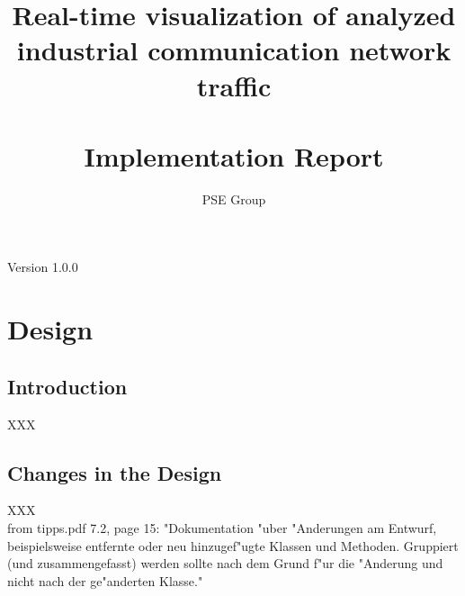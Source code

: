 \documentclass[oneside, english, final]{design}
\author{PSE Group}
\title{Real-time visualization of analyzed industrial communication network traffic\\ \hfill \\Implementation Report}
\begin{document}
\nocite{*}

\setpdf

\maketitle


\hfill

\begin{center}
	\large{Version 1.0.0}
\end{center}


\thispagestyle{empty}
\begin{abstract}
	\thispagestyle{empty}
\end{abstract}

\thispagestyle{empty}
\newpage
\thispagestyle{empty}
\tableofcontents
\cleardoublepage
\setcounter{page}{1}


\section{Design}\label{sec:intro}
\subsection{Introduction}
XXX
\\
\subsection{Changes in the Design}
XXX
\\
from tipps.pdf 7.2, page 15:
"Dokumentation "uber "Anderungen am Entwurf, beispielsweise entfernte oder neu hinzugef"ugte 
Klassen und Methoden. Gruppiert (und zusammengefasst) werden sollte nach dem Grund f"ur
die "Anderung und nicht nach der ge"anderten Klasse."
\end{document}
